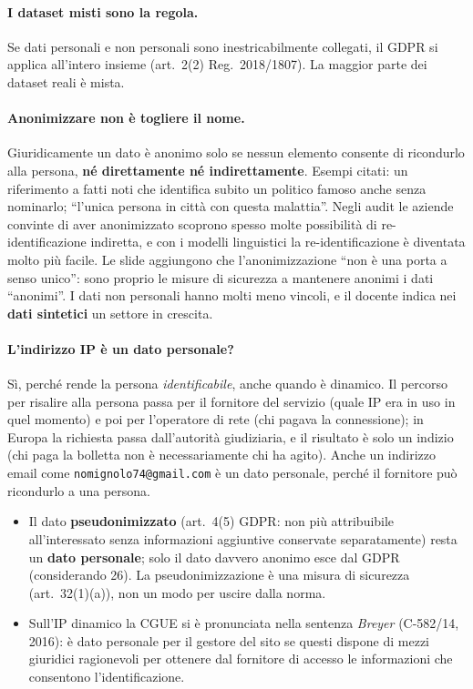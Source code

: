 \paragraph{I dataset misti sono la regola.} Se dati personali e non personali sono inestricabilmente
collegati, il GDPR si applica all'intero insieme (art.~2(2) Reg.~2018/1807). La maggior parte dei
dataset reali è mista.

\paragraph{Anonimizzare non è togliere il nome.} Giuridicamente un dato è anonimo solo se nessun
elemento consente di ricondurlo alla persona, \textbf{né direttamente né indirettamente}. Esempi
citati: un riferimento a fatti noti che identifica subito un politico famoso anche senza nominarlo;
``l'unica persona in città con questa malattia''. Negli audit le aziende convinte di aver anonimizzato
scoprono spesso molte possibilità di re-identificazione indiretta, e con i modelli linguistici la
re-identificazione è diventata molto più facile. Le slide aggiungono che l'anonimizzazione ``non è una
porta a senso unico'': sono proprio le misure di sicurezza a mantenere anonimi i dati ``anonimi''. I dati
non personali hanno molti meno vincoli, e il docente indica nei \textbf{dati sintetici} un settore in
crescita.

\paragraph{L'indirizzo IP è un dato personale?} Sì, perché rende la persona \emph{identificabile}, anche
quando è dinamico. Il percorso per risalire alla persona passa per il fornitore del servizio (quale IP
era in uso in quel momento) e poi per l'operatore di rete (chi pagava la connessione); in Europa la
richiesta passa dall'autorità giudiziaria, e il risultato è solo un indizio (chi paga la bolletta non è
necessariamente chi ha agito). Anche un indirizzo email come \texttt{nomignolo74@gmail.com} è un dato
personale, perché il fornitore può ricondurlo a una persona.

\begin{integrazione}
\begin{itemize}
  \item Il dato \textbf{pseudonimizzato} (art.~4(5) GDPR: non più attribuibile all'interessato senza
    informazioni aggiuntive conservate separatamente) resta un \textbf{dato personale}; solo il dato
    davvero anonimo esce dal GDPR (considerando 26). La pseudonimizzazione è una misura di sicurezza
    (art.~32(1)(a)), non un modo per uscire dalla norma.
  \item Sull'IP dinamico la CGUE si è pronunciata nella sentenza \emph{Breyer} (C-582/14, 2016): è dato
    personale per il gestore del sito se questi dispone di mezzi giuridici ragionevoli per ottenere
    dal fornitore di accesso le informazioni che consentono l'identificazione.
\end{itemize}
\end{integrazione}

